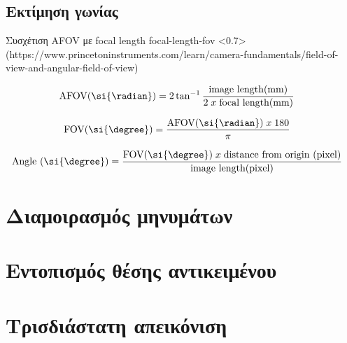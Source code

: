 \subsection{Εκτίμηση γωνίας}

{Συσχέτιση AFOV με focal length} %
{focal-length-fov} %
<0.7>
(https://www.princetoninstruments.com/learn/camera-fundamentals/field-of-view-and-angular-field-of-view)

\begin{align}
	\textrm{AFOV(\si{\radian})} &= 2\tan^{-1}{\frac{\textrm{image length(mm)}}{2\; x\;\textrm{focal length(mm)}}} \label{eq:afov-focal-length}
\end{align}

\begin{align}
	\textrm{FOV(\si{\degree})} &= \frac{\textrm{AFOV(\si{\radian})}\; x\;\textrm{180}}{\pi} \label{eq:afov-to-fov}
\end{align}

\begin{align}
	\textrm{Angle (\si{\degree})} &= \frac{\textrm{FOV(\si{\degree})}\; x\;\textrm{distance from origin (pixel)}}{\textrm{image length(pixel)}} \label{eq:angle-from-object-center-pixels}
\end{align}

\section{Διαμοιρασμός μηνυμάτων}

\section{Εντοπισμός θέσης αντικειμένου}

\section{Τρισδιάστατη απεικόνιση}


